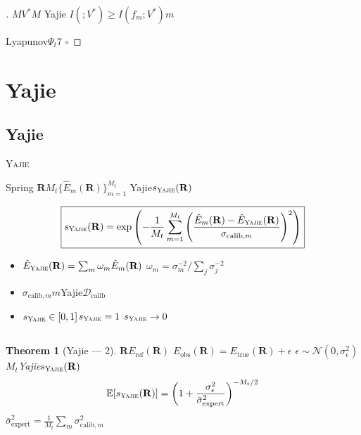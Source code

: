 \documentclass[12pt,a4paper]{article}
\newtheorem{theorem}{Theorem}[section]
\theoremstyle{remark}
\newcommand{\E}{\mathbb{E}}
\newcommand{\D}{\mathcal{D}}
\newcommand{\Yajie}{\textsc{Yajie}}
\newcommand{\Lyap}{\ensuremath{\Psi}}
\begin{document}
\begin{proof}[]
$M$$V^*$$M$
Yajie
$I(\text{}; V^*) \geq I(f_m; V^*)$$m$

Lyapunov$\Lyap_t$7
\hfill $\square$
\end{proof}

\newpage

\section{Yajie}

\subsection{Yajie}

\Yajie{}~\cite{yajie_protocol}\textbf{
}

Spring
$\mathbf{R}$$M_t$$\{\hat{E}_m(\mathbf{R})\}_{m=1}^{M_t}$
Yajie$s_{\Yajie}(\mathbf{R})$

\begin{equation}\label{eq:yajie_score}
    \boxed{s_{\Yajie}(\mathbf{R}) = \exp\left(-\frac{1}{M_t} \sum_{m=1}^{M_t} \left(\frac{\hat{E}_m(\mathbf{R}) - \hat{E}_{\Yajie}(\mathbf{R})}{\sigma_{\text{calib}, m}}\right)^2\right)}
\end{equation}


\begin{itemize}[nosep]
    \item $\hat{E}_{\Yajie}(\mathbf{R}) = \sum_m \omega_m \hat{E}_m(\mathbf{R})$
    $\omega_m = \sigma_m^{-2} / \sum_j \sigma_j^{-2}$
    \item $\sigma_{\text{calib}, m}$$m$Yajie$\D_{\text{calib}}$
    
    \item $s_{\Yajie} \in [0,1]$$s_{\Yajie} = 1$
    $s_{\Yajie} \to 0$
\end{itemize}

\subsection{}

\begin{theorem}[Yajie — 2]\label{thm:yajie_noise}
$\mathbf{R}$$E_{\text{ref}}(\mathbf{R})$
$E_{\text{obs}}(\mathbf{R}) = E_{\text{true}}(\mathbf{R}) + \epsilon$
$\epsilon \sim \mathcal{N}(0, \sigma_\epsilon^2)$
$M_t$Yajie$s_{\Yajie}(\mathbf{R})$
\begin{equation}\label{eq:yajie_noise_expectation}
    \E[s_{\Yajie}(\mathbf{R})] = \left(1 + \frac{\sigma_\epsilon^2}{\bar{\sigma}_{\text{expert}}^2}\right)^{-M_t/2}
\end{equation}
$\bar{\sigma}_{\text{expert}}^2 = \frac{1}{M_t}\sum_m \sigma_{\text{calib}, m}^2$
\end{theorem}
\end{document}
